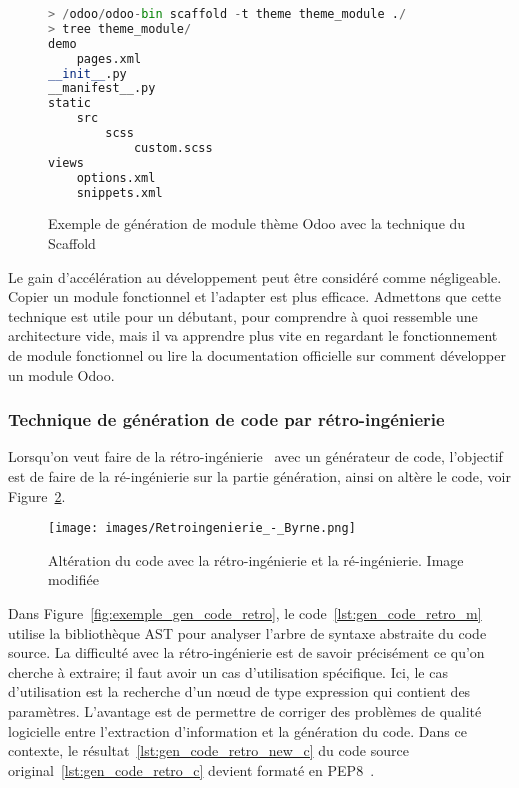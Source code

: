 \begin{figure}
\begin{lstlisting}[language=Python]
> /odoo/odoo-bin scaffold -t theme theme_module ./
> tree theme_module/
demo
    pages.xml
__init__.py
__manifest__.py
static
    src
        scss
            custom.scss
views
    options.xml
    snippets.xml
\end{lstlisting}
\caption{Exemple de génération de module thème Odoo avec la technique du Scaffold}
\label{fig:exemple_odoo_scaffold_theme}
\end{figure}

Le gain d’accélération au développement peut être considéré comme négligeable. Copier un module fonctionnel et l'adapter est plus efficace. Admettons que cette technique est utile pour un débutant, pour comprendre à quoi ressemble une architecture vide, mais il va apprendre plus vite en regardant le fonctionnement de module fonctionnel ou lire la documentation officielle sur comment développer un module Odoo.

\subsubsection{Technique de génération de code par rétro-ingénierie}

Lorsqu'on veut faire de la rétro-ingénierie~\cite{wikipedia_retroingenierie} avec un générateur de code, l'objectif est de faire de la ré-ingénierie sur la partie génération, ainsi on altère le code, voir Figure~\ref{fig:retro_re_ing}.

\begin{figure}[htb]
\centering
\texttt{[image: images/Retroingenierie\_-\_Byrne.png]}
\caption{Altération du code avec la rétro-ingénierie et la ré-ingénierie. Image modifiée~\cite{wikipedia_image_retroingenierie}}
\label{fig:retro_re_ing}
\end{figure}

Dans Figure~\ref{fig:exemple_gen_code_retro}, le code~\ref{lst:gen_code_retro_m} utilise la bibliothèque AST pour analyser l’arbre de syntaxe abstraite du code source. La difficulté avec la rétro-ingénierie est de savoir précisément ce qu’on cherche à extraire; il faut avoir un cas d’utilisation spécifique. Ici, le cas d’utilisation est la recherche d’un nœud de type expression qui contient des paramètres. L’avantage est de permettre de corriger des problèmes de qualité logicielle entre l’extraction d’information et la génération du code. Dans ce contexte, le résultat~\ref{lst:gen_code_retro_new_c} du code source original~\ref{lst:gen_code_retro_c} devient formaté en PEP8~\cite{python_pep8}.

